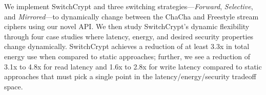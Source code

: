 We implement SwitchCrypt and three switching strategies---\emph{Forward},
\emph{Selective}, and \emph{Mirrored}---to dynamically change between 
the ChaCha and Freestyle
stream ciphers using our novel API. We then study SwitchCrypt's dynamic
flexibility through four case studies where latency, energy, and desired
security properties change dynamically. SwitchCrypt achieves a reduction of at
least 3.3x in total energy use when compared to static approaches; further, we
see a reduction of 3.1x to 4.8x for read latency and 1.6x to 2.8x for write
latency compared to static approaches that must pick a single point in the 
latency/energy/security tradeoff space.
